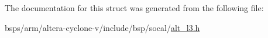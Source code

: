 The documentation for this struct was generated from the following file\+:\begin{DoxyCompactItemize}
\item 
bsps/arm/altera-\/cyclone-\/v/include/bsp/socal/\mbox{\hyperlink{alt__l3_8h}{alt\+\_\+l3.\+h}}\end{DoxyCompactItemize}
